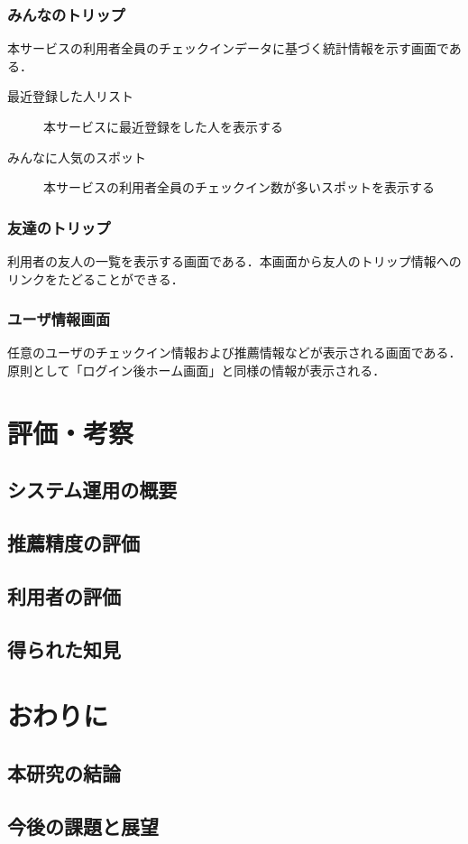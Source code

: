 \documentclass{jsarticle}
\begin{document}
\subsubsection{みんなのトリップ}

本サービスの利用者全員のチェックインデータに基づく統計情報を示す画面である．

\begin{description}
\item[最近登録した人リスト] 本サービスに最近登録をした人を表示する
\item[みんなに人気のスポット] 本サービスの利用者全員のチェックイン数が多いスポットを表示する
\end{description}

\subsubsection{友達のトリップ}

利用者の友人の一覧を表示する画面である．本画面から友人のトリップ情報へのリンクをたどることができる．

\subsubsection{ユーザ情報画面}

任意のユーザのチェックイン情報および推薦情報などが表示される画面である．原則として「ログイン後ホーム画面」と同様の情報が表示される．

\section{評価・考察}
\subsection{システム運用の概要}
\subsection{推薦精度の評価}
\subsection{利用者の評価}
\subsection{得られた知見}

\section{おわりに}
\subsection{本研究の結論}
\subsection{今後の課題と展望}

\newpage

\end{document}
